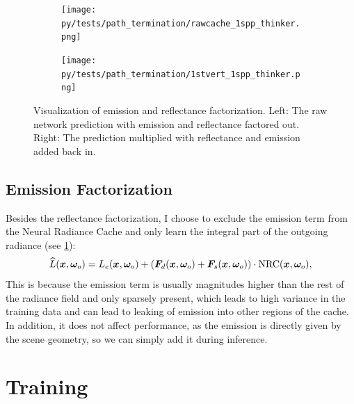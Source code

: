 \begin{figure}[htb!]
    \centering
    \begin{subfigure}{0.3\textwidth}
        \centering
        \texttt{[image: py/tests/path\_termination/rawcache\_1spp\_thinker.png]}
    \end{subfigure}%
    \begin{subfigure}{0.3\textwidth}
        \centering
        \texttt{[image: py/tests/path\_termination/1stvert\_1spp\_thinker.png]}
    \end{subfigure}
    \caption{Visualization of emission and reflectance factorization. Left: The raw network prediction with emission and reflectance factored out. Right: The prediction multiplied with reflectance and emission added back in.}
    \label{fig:nrc_factorization}
\end{figure}

\subsection{Emission Factorization}
Besides the reflectance factorization, I choose to exclude the emission term from the Neural Radiance Cache and only learn the integral part of the outgoing radiance (see \cref{fig:nrc_factorization}):
\begin{equation}
    \widehat{L}(\vec{x}, \wo) = L_e(\vec{x}, \wo) + \left( \vec{F}_d(\vec{x}, \wo) + \vec{F}_s(\vec{x}, \wo) \right) \cdot \mathrm{NRC}(\vec{x}, \wo),
\end{equation}
This is because the emission term is usually magnitudes higher than the rest of the radiance field and only sparsely present, which leads to high variance in the training data and can lead to leaking of emission into other regions of the cache.
In addition, it does not affect performance, as the emission is directly given by the scene geometry, so we can simply add it during inference.

\section{Training}

